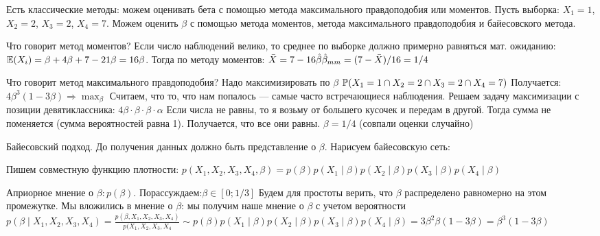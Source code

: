 Есть классические методы: можем оценивать бета с помощью метода максимального правдоподобия или моментов. 
Пусть выборка: $X_1=1$, $X_2=2$, $X_3=2$, $X_4=7$.
Можем оценить  $\beta$ с помощью метода моментов, метода максимального правдоподобия и байесовского метода.


Что говорит метод моментов? 
Если число наблюдений велико, то среднее по выборке должно примерно равняться мат. ожиданию:
 $\E(X_i)=\beta+4\beta+7-21\beta=16\beta$. 
Тогда по методу моментов: $\bar{X}=7-16\hat{\beta}\\
\hat{\beta}_{mm}=(7-\bar{X})/16=1/4$

Что говорит метод максимального правдоподобия?
Надо максимизировать по $\beta$ $\P(X_1=1 \cap X_2=2 \cap X_3=2 \cap X_4=7)$
Получается: $4\beta^3(1-3\beta) \Rightarrow \max_{\beta}$
Считаем, что то, что нам попалось --- самые часто встречающиеся наблюдения.
Решаем задачу максимизации с позиции девятиклассника: $4\beta \cdot \beta \cdot \beta \cdot \alpha$
 Если числа не равны, то я возьму от большего кусочек и передам в другой. Тогда сумма не поменяется (сумма вероятностей равна 1). Получается, что все они равны. $\beta=1/4$ (совпали оценки случайно)

Байесовский подход.
До получения данных должно быть представление о $\beta$. Нарисуем байесовскую сеть: 


Пишем совместную функцию плотности: $p(X_1,X_2,X_3,X_4,\beta)=p(\beta)p(X_1 \mid \beta)p(X_2 \mid \beta)p(X_3 \mid \beta)p(X_4 \mid \beta)$

Априорное мнение о  $\beta: p(\beta)$.
Порассуждаем:$\beta \in [0;1/3]$
Будем для простоты верить, что  $\beta$ распределено равномерно на этом промежутке. 
Мы вложились в мнение о $\beta$: мы получим наше мнение о $\beta$ с учетом вероятности $p(\beta \mid X_1,X_2,X_3,X_4)=\frac{p(\beta,X_1,X_2,X_3,X_4)}{p(X_1,X_2,X_3,X_4}\sim p(\beta)p(X_1 \mid \beta)p(X_2 \mid \beta)p(X_3 \mid \beta)p(X_4 \mid \beta)=3\beta^2\beta(1-3\beta)=\beta^3(1-3\beta)$

